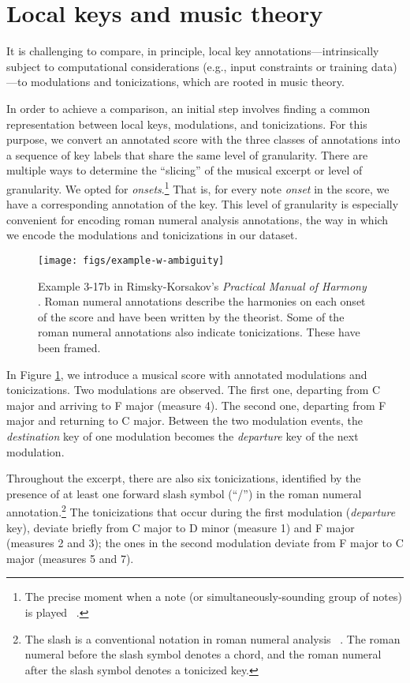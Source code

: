 \documentclass[sigconf]{acmart}
\begin{document}
\section{Local keys and music theory}\label{sec:prob}

It is challenging to compare, in principle, local key annotations---intrinsically subject to computational considerations (e.g., input constraints or training data)---to modulations and tonicizations, which are rooted in music theory.

In order to achieve a comparison, an initial step involves finding a common representation between local keys, modulations, and tonicizations.
For this purpose, we convert an annotated score with the three classes of annotations into a sequence of key labels that share the same level of granularity. 
There are multiple ways to determine the ``slicing'' of the musical excerpt or level of granularity. 
We opted for \emph{onsets}.\footnote{The precise moment when a note (or simultaneously-sounding group of notes) is played ~\cite{bello05onset}.} 
That is, for every note \emph{onset} in the score, we have a corresponding annotation of the key. 
This level of granularity is especially convenient for encoding roman numeral analysis annotations, the way in which we encode the modulations and tonicizations in our dataset.

\begin{figure}[h]
  \centering
  \texttt{[image: figs/example-w-ambiguity]}
  \caption{Example 3-17b in Rimsky-Korsakov's \emph{Practical Manual of Harmony} \cite{rimskitonality}.
  Roman numeral annotations describe the harmonies on each onset of the score and have been written by the theorist. Some of the roman numeral annotations also indicate tonicizations. These have been framed.}
  \label{fig:example}
\end{figure}

In Figure \ref{fig:example}, we introduce a musical score with annotated modulations and tonicizations. 
Two modulations are observed. 
The first one, departing from C major and arriving to F major (measure 4). 
The second one, departing from F major and returning to C major. Between the two modulation events, the \emph{destination} key of one modulation becomes the \emph{departure} key of the next modulation.

Throughout the excerpt, there are also six tonicizations, identified by the presence of at least one forward slash symbol (``/'') in the roman numeral annotation.\footnote{The slash is a conventional notation in roman numeral analysis ~\cite{Tymoczko2019, huron_representation}. The roman numeral before the slash symbol denotes a chord, and the roman numeral after the slash symbol denotes a tonicized key.} 
The tonicizations that occur during the first modulation (\emph{departure} key), deviate briefly from C major to D minor (measure 1) and F major (measures 2 and 3); the ones in the second modulation deviate from F major to C major (measures 5 and 7).
\end{document}
